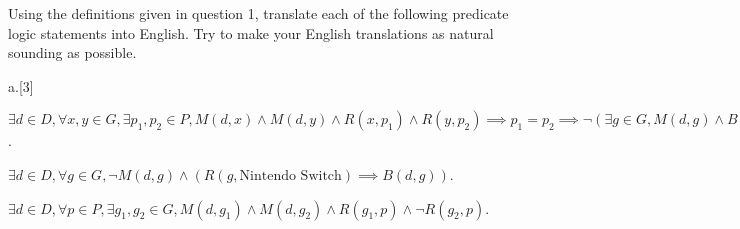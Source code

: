 %
%
\item[9] 

Using the definitions given in question 1, translate each of the
  following predicate logic statements into English. Try to make your English translations
  as natural sounding as possible.

  \begin{question}{a.}[3]
  \item[3] $\exists d \in D, \forall x,y \in G, \exists p_1, p_2 \in P, M(d,x) \land M(d,y) \land R(x,p_1) \land R(y,p_2) \implies p_1 = p_2 \implies \lnot(\exists g \in G, M(d,g) \land B(d,g))$.
  \begin{Questions}
    \vfill
  \end{Questions}
  
  \item[3] $\exists d \in D, \forall g \in G, \lnot M(d,g) \land (R(g, \text{Nintendo Switch}) \implies B(d,g))$.
  \begin{Questions}
    \vfill
  \end{Questions}

  \item[3] $\exists d \in D, \forall p \in P, \exists  g_1, g_2 \in G, M(d, g_1) \land M(d, g_2) \land R(g_1, p) \land \lnot R(g_2, p)$.
  \begin{Questions}
    \vfill
  \end{Questions}
  
  \end{question}